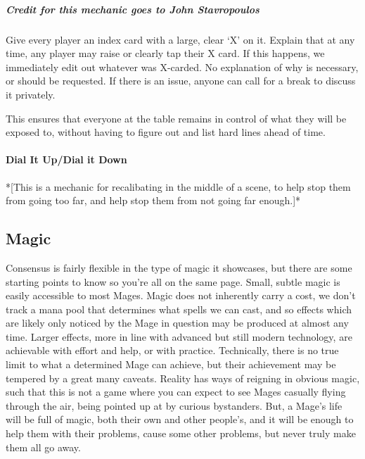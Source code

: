 \documentclass[
  oneside,
  statementpaper,
  9pt]{memoir}
\begin{document}
\hypertarget{credit-for-this-mechanic-goes-to-john-stavropoulos}{%
\subparagraph{Credit for this mechanic goes to John
Stavropoulos}\label{credit-for-this-mechanic-goes-to-john-stavropoulos}}

\begin{Narrator}

Give every player an index card with a large, clear ‘X’ on it. Explain that at any time, any player may raise or clearly tap their X card. If this happens, we immediately edit out whatever was X-carded. No explanation of why is necessary, or should be requested. If there is an issue, anyone can call for a break to discuss it privately.

This ensures that everyone at the table remains in control of what they will be exposed to, without having to figure out and list hard lines ahead of time.

\end{Narrator}

\hypertarget{dial-it-updial-it-down}{%
\paragraph{Dial It Up/Dial it Down}\label{dial-it-updial-it-down}}

\begin{Narrator}

*[This is a mechanic for recalibating in the middle of a scene, to help stop them from going too far, and help stop them from not going far enough.]*

\end{Narrator}

\hypertarget{magic-1}{%
\subsection{Magic}\label{magic-1}}

\begin{Narrator}

Consensus is fairly flexible in the type of magic it showcases, but there are some starting points to know so you’re all on the same page. Small, subtle magic is easily accessible to most Mages. Magic does not inherently carry a cost, we don’t track a mana pool that determines what spells we can cast, and so effects which are likely only noticed by the Mage in question may be produced at almost any time. Larger effects, more in line with advanced but still modern technology, are achievable with effort and help, or with practice. Technically, there is no true limit to what a determined Mage can achieve, but their achievement may be tempered by a great many caveats. Reality has ways of reigning in obvious magic, such that this is not a game where you can expect to see Mages casually flying through the air, being pointed up at by curious bystanders. But, a Mage’s life will be full of magic, both their own and other people’s, and it will be enough to help them with their problems, cause some other problems, but never truly make them all go away.

\end{Narrator}
\end{document}
